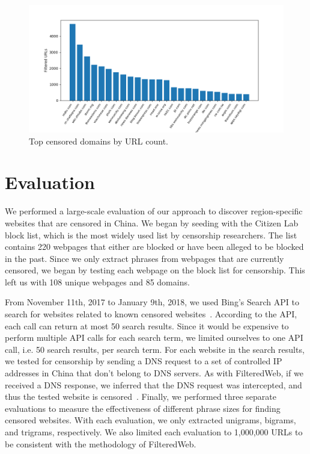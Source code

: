 \begin{figure}[t]
  \centering
  \includegraphics[scale=0.6]{figures/top-domains}
  \caption{\label{top-domains}Top censored domains by URL count.}
\end{figure}

\section{Evaluation}

We performed a large-scale evaluation of our approach to
discover region-specific websites that are censored in China.  We
began by seeding with the Citizen Lab block list, which is
the most widely used list by censorship researchers. The list contains
220 webpages that either are blocked or have been alleged to be blocked in
the past. Since we only extract phrases from webpages that are
currently censored, we began by testing each webpage on the block list for
censorship. This left us with 108 unique webpages and 85 domains.

From November 11th, 2017 to January 9th, 2018, we used Bing's Search
API to search for websites related to known censored
websites~\cite{microsoft:bing}. According to the API, each call can
return at most 50 search results. Since it would be expensive to
perform multiple API calls for each search term, we limited ourselves
to one API call, i.e. 50 search results, per search term. For 
each website in the search results, we tested for censorship by
sending a DNS request to a set of controlled IP addresses in China
that don't belong to DNS servers. As with FilteredWeb, if we
received a DNS response, we inferred that the DNS request was
intercepted, and thus the tested website is
censored~\cite{darer2017filteredweb}. Finally, we performed three
separate evaluations to measure the effectiveness of different phrase
sizes for finding censored websites. With each evaluation, we only
extracted unigrams, bigrams, and trigrams, respectively. We also limited
each evaluation to 1,000,000 URLs to be consistent with the
methodology of FilteredWeb.

